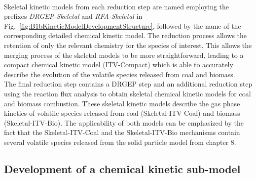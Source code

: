 \begin{refsection}
\\
Skeletal kinetic models from each reduction step are named employing the prefixes \textit{DRGEP-Skeletal} and \textit{RFA-Skeletal} in Fig.~\ref{fig:B1bKineticModelDevelopmentStructure}, followed by the name of the corresponding detailed chemical kinetic model. The reduction process allows the retention of only the relevant chemistry for the species of interest. This allows the merging process of the skeletal models to be more straightforward, leading to a compact chemical kinetic model (ITV-Compact) which is able to accurately describe the evolution of the volatile species released from coal and biomass.
\\
The final reduction step contains a DRGEP step and an additional reduction step using the reaction flux analysis to obtain skeletal chemical kinetic models for coal and biomass combustion. These skeletal kinetic models describe the gas phase kinetics of volatile species released from coal (Skeletal-ITV-Coal) and biomass (Skeletal-ITV-Bio). The applicability of both models can be emphasized by the fact that the Skeletal-ITV-Coal and the Skeletal-ITV-Bio mechanisms contain several volatile species released from the solid particle model from chapter 8.


\subsection{Development of a  chemical kinetic sub-model}


\end{refsection}
